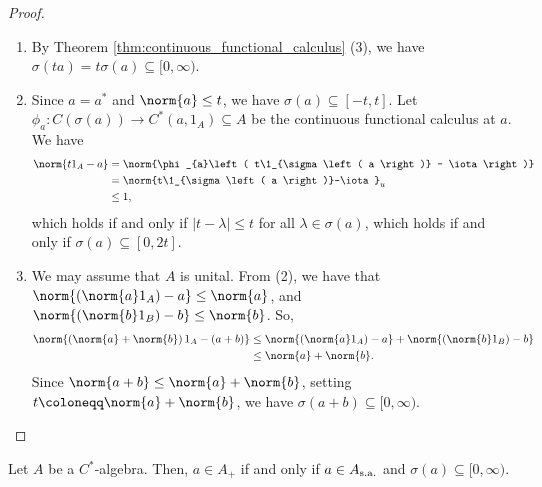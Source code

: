\begin{proof}\hfill
  \begin{enumerate}[(1)]
    \item By Theorem \ref{thm:continuous_functional_calculus} (3), we have $\sigma\left( ta \right) = t\sigma\left( a \right)\subseteq [0,\infty)$.
    \item Since $a = a^{\ast}$ and $\norm{a}\leq t$, we have $\sigma\left( a \right)\subseteq [-t,t]$. Let $\phi_a\colon C\left( \sigma\left( a \right) \right)\rightarrow C^{\ast}\left( a,1_A \right)\subseteq A$ be the continuous functional calculus at $a$. We have
      \begin{align*}
        \norm{t1_A - a} &= \norm{\phi_{a}\left( t\1_{\sigma\left( a \right)} - \iota \right)}\\
                        &= \norm{t\1_{\sigma\left( a \right)}-\iota}_{u}\\
                        &\leq 1,
      \end{align*}
      which holds if and only if $\left\vert t - \lambda \right\vert \leq t$ for all $\lambda\in \sigma\left( a \right)$, which holds if and only if $\sigma\left( a \right)\subseteq [0,2t]$.
    \item We may assume that $A$ is unital. From (2), we have that $\norm{\left( \norm{a}1_A \right) - a}\leq \norm{a}$, and $\norm{\left( \norm{b}1_B \right) - b}\leq \norm{b}$. So,
      \begin{align*}
        \norm{\left( \norm{a} + \norm{b} \right)1_A - \left( a+b \right)} &\leq \norm{\left( \norm{a}1_A \right)-a} + \norm{\left( \norm{b}1_B \right) - b}\\
                                                                          &\leq \norm{a} + \norm{b}.
      \end{align*}
      Since $\norm{a +b}\leq \norm{a} + \norm{b}$, setting $t \coloneq \norm{a} + \norm{b}$, we have $\sigma\left( a + b \right)\subseteq [0,\infty)$.
  \end{enumerate}
\end{proof}
\begin{theorem}
  Let $A$ be a $C^{\ast}$-algebra. Then, $a\in A_{+}$ if and only if $a\in A_{\operatorname{s.a.}}$ and $\sigma\left( a \right)\subseteq [0,\infty)$.
\end{theorem}
